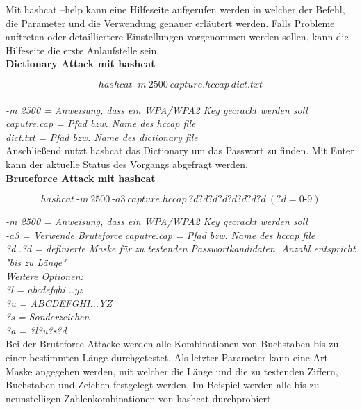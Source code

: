 
Mit hashcat --help kann eine Hilfeseite aufgerufen werden in welcher der Befehl, die Parameter und die Verwendung
genauer erläutert werden. Falls Probleme auftreten oder detailliertere Einstellungen vorgenommen werden sollen, kann 
die Hilfeseite die erste Anlaufstelle sein.\\

\textbf{Dictionary Attack mit hashcat}

$$hashcat~\text{-}m~2500~capture.hccap~dict.txt$$\\

\textit{-m 2500 = Anweisung, dass ein WPA/WPA2 Key gecrackt werden soll}\\
\textit{caputre.cap = Pfad bzw. Name des hccap file}\\
\textit{dict.txt = Pfad bzw. Name des dictionary file}\\

Anschließend nutzt hashcat das Dictionary um das Passwort zu finden.
Mit Enter kann der aktuelle Status des Vorgangs abgefragt werden.\\ 

\textbf{Bruteforce Attack mit hashcat}

$$hashcat~\text{-}m~2500~\text{-}a3~capture.hccap~?d?d?d?d?d?d?d?d~(?d = 0\text{-}9)$$

\textit{-m 2500 = Anweisung, dass ein WPA/WPA2 Key gecrackt werden soll}\\
\textit{-a3 = Verwende Bruteforce}
\textit{caputre.cap = Pfad bzw. Name des hccap file}\\
\textit{?d..?d = definierte Maske für zu testenden Passwortkandidaten, Anzahl entspricht "bis zu Länge"\\
Weitere Optionen:\\
?l = abcdefghi...yz\\
?u = ABCDEFGHI...YZ\\
?s = Sonderzeichen\\
?a = ?l?u?s?d}\\

Bei der Bruteforce Attacke werden alle Kombinationen von Buchstaben bis zu einer bestimmten Länge durchgetestet.
Als letzter Parameter kann eine Art Maske angegeben werden, mit welcher die Länge und die zu testenden Ziffern, Buchstaben
und Zeichen festgelegt werden. Im Beispiel werden alle bis zu neunstelligen Zahlenkombinationen von hashcat durchprobiert.\\ 

